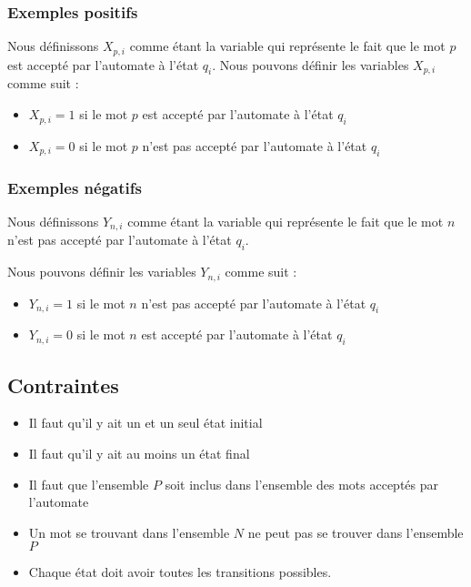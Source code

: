 \documentclass[a4paper, 12pt]{extarticle}
\begin{document}

\subsubsection{Exemples positifs} %
\label{sec:exemples_positifs}

Nous définissons $X_{p, i}$ comme étant la variable qui représente le fait que le mot $p$ est accepté par l'automate à l'état $q_i$.
Nous pouvons définir les variables $X_{p, i}$ comme suit : 
\begin{itemize}[label=$\bullet$]
    \item $X_{p, i} = 1$ si le mot $p$ est accepté par l'automate à l'état $q_i$ 
    \item $X_{p, i} = 0$ si le mot $p$ n'est pas accepté par l'automate à l'état $q_i$ 
\end{itemize}


\subsubsection{Exemples négatifs} %
\label{sec:exemples_negatifs} 

Nous définissons $Y_{n, i}$ comme étant la variable qui représente le fait que le mot $n$ n'est pas accepté par l'automate à l'état $q_i$. 

Nous pouvons définir les variables $Y_{n, i}$ comme suit : 
\begin{itemize}[label=$\bullet$]
    \item $Y_{n, i} = 1$ si le mot $n$ n'est pas accepté par l'automate à l'état $q_i$ 
    \item $Y_{n, i} = 0$ si le mot $n$ est accepté par l'automate à l'état $q_i$ 
\end{itemize}


\subsection{Contraintes} %
\label{sub:contraintes}

\begin{itemize}
    \item Il faut qu'il y ait un et un seul état initial 
    \item Il faut qu'il y ait au moins un état final
    \item Il faut que l'ensemble $P$ soit inclus dans l'ensemble des mots acceptés par l'automate 
    \item Un mot se trouvant dans l'ensemble $N$ ne peut pas se trouver dans l'ensemble $P$ 
    \item Chaque état doit avoir toutes les transitions possibles. 
\end{itemize}
\end{document}
